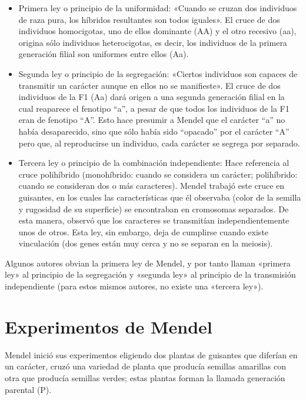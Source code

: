 \documentclass{report}
\begin{document}
\begin{itemize}
  \item Primera ley o principio de la uniformidad: «Cuando se cruzan dos individuos de raza pura, los híbridos resultantes son todos iguales». El cruce de dos individuos homocigotas, uno de ellos dominante (AA) y el otro recesivo (aa), origina sólo individuos heterocigotas, es decir, los individuos de la primera generación filial son uniformes entre ellos (Aa).

  \item Segunda ley o principio de la segregación: «Ciertos individuos son capaces de transmitir un carácter aunque en ellos no se manifieste». El cruce de dos individuos de la F1 (Aa) dará origen a una segunda generación filial en la cual reaparece el fenotipo ``a'', a pesar de que todos los individuos de la F1 eran de fenotipo ``A''. Esto hace presumir a Mendel que el carácter ``a'' no había desaparecido, sino que sólo había sido ``opacado'' por el carácter ``A'' pero que, al reproducirse un individuo, cada carácter se segrega por separado.
  \item Tercera ley o principio de la combinación independiente: Hace referencia al cruce polihíbrido (monohíbrido: cuando se considera un carácter; polihíbrido: cuando se consideran dos o más caracteres). Mendel trabajó este cruce en guisantes, en los cuales las características que él observaba (color de la semilla y rugosidad de su superficie) se encontraban en cromosomas separados. De esta manera, observó que los caracteres se transmitían independientemente unos de otros. Esta ley, sin embargo, deja de cumplirse cuando existe vinculación (dos genes están muy cerca y   no se separan en la meiosis).
\end{itemize}

Algunos autores obvian la primera ley de Mendel, y por tanto llaman «primera ley» al principio de la segregación y «segunda ley» al principio de la transmisión independiente (para estos mismos autores, no existe una «tercera ley»).

\chapter{Experimentos de Mendel}

Mendel inició sus experimentos eligiendo dos plantas de guisantes que diferían en un carácter, cruzó una variedad de planta que producía semillas amarillas con otra que producía semillas verdes; estas plantas forman la llamada generación parental (P).
\end{document}
